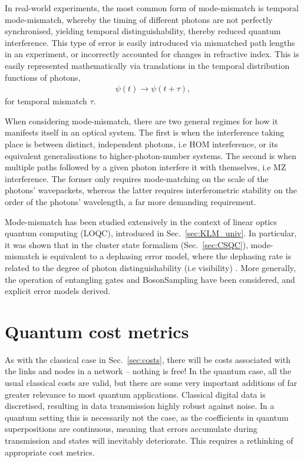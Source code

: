 \documentclass[aps,rmp,twocolumn,amsmath,amssymb,nofootinbib,superscriptaddress,longbibliography,floatfix]{revtex4-1}
\begin{document}
In real-world experiments, the most common form of mode-mismatch is temporal mode-mismatch, whereby the timing of different photons are not perfectly synchronised, yielding temporal distinguishability, thereby reduced quantum interference. This type of error is easily introduced via mismatched path lengths in an experiment, or incorrectly accounted for changes in refractive index. This is easily represented mathematically via translations in the temporal distribution functions of photons,
\begin{align}
\psi(t) \to \psi(t+\tau),
\end{align}
for temporal mismatch $\tau$.

When considering mode-mismatch, there are two general regimes for how it manifests itself in an optical system. The first is when the interference taking place is between distinct, independent photons, i.e HOM interference, or its equivalent generalisations to higher-photon-number systems. The second is when multiple paths followed by a given photon interfere it with themselves, i.e MZ interference. The former only requires mode-matching on the scale of the photons' wavepackets, whereas the latter requires interferometric stability on the order of the photons' wavelength, a far more demanding requirement.

Mode-mismatch has been studied extensively in the context of linear optics quantum computing (LOQC), introduced in Sec.~\ref{sec:KLM_univ}. In particular, it was shown that in the cluster state formalism (Sec.~\ref{sec:CSQC}), mode-mismatch is equivalent to a dephasing error model, where the dephasing rate is related to the degree of photon distinguishability (i.e visibility) \cite{bib:RohdeRalph06}. More generally, the operation of entangling gates \cite{bib:RohdeFreqTemp05, bib:RohdeGateChar05, bib:RohdeOptPhot05, bib:RohdeTimeRes11} and {\sc BosonSampling} \cite{bib:RohdeArbSpec15, bib:RohdeArbLow12} have been considered, and explicit error models derived.

%
%

\section{Quantum cost metrics} \label{sec:quantum_meas_cost}

As with the classical case in Sec.~\ref{sec:costs}, there will be costs associated with the links and nodes in a network -- nothing is free! In the quantum case, all the usual classical costs are valid, but there are some very important additions of far greater relevance to most quantum applications. Classical digital data is discretised, resulting in data transmission highly robust against noise. In a quantum setting this is necessarily not the case, as the coefficients in quantum superpositions are continuous, meaning that errors accumulate during transmission and states will inevitably deteriorate. This requires a rethinking of appropriate cost metrics.
\end{document}
